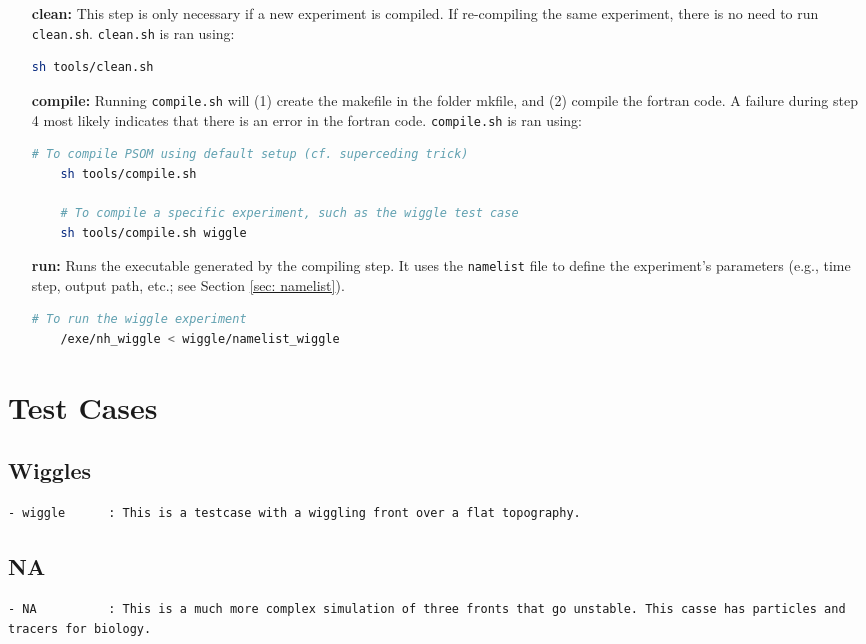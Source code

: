 \documentclass[12pt,letterpaper,titlepage]{article}
\begin{document}
\begin{itemize}
	\item[\textbf{clean:}] This step is only necessary if a new experiment is compiled. If re-compiling the same experiment, there is no need to run \texttt{clean.sh}. \texttt{clean.sh} is ran using:
\begin{lstlisting}[language=sh, breaklines]
	sh tools/clean.sh
\end{lstlisting}

	\item[\textbf{compile:}] Running \texttt{compile.sh} will (1) create the makefile in the folder mkfile, and (2) compile the fortran code. A failure during step 4 most likely indicates that there is an error in the fortran code. \texttt{compile.sh} is ran using:
\begin{lstlisting}[language=sh, breaklines]
	# To compile PSOM using default setup (cf. superceding trick)
	sh tools/compile.sh
	
	# To compile a specific experiment, such as the wiggle test case
	sh tools/compile.sh wiggle	
\end{lstlisting}
		\item[\textbf{run:}] Runs the executable generated by the compiling step. It uses the \texttt{namelist} file to define the experiment's parameters (e.g., time step, output path, etc.; see Section \ref{sec: namelist}).
\begin{lstlisting}[language=sh, breaklines]
	# To run the wiggle experiment
	/exe/nh_wiggle < wiggle/namelist_wiggle
\end{lstlisting}
\end{itemize}

\section{Test Cases}
\subsection{Wiggles}
\label{sec: Wiggles}
\begin{lstlisting}
- wiggle      : This is a testcase with a wiggling front over a flat topography.  
\end{lstlisting}

\subsection{NA}
\label{sec: NA}
\begin{lstlisting}
- NA          : This is a much more complex simulation of three fronts that go unstable. This casse has particles and tracers for biology.
\end{lstlisting}
\end{document}
